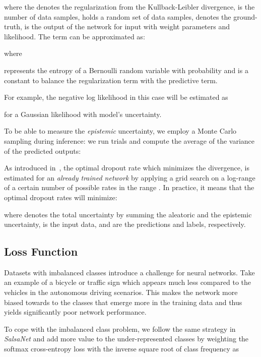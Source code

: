 \documentclass[letterpaper, 10 pt, conference]{ieeeconf}
\newcommand{\sn}[1]{\textit{SalsaNet }{#1}}
\begin{document}
where the  denotes the regularization from the Kullback-Leibler divergence,  is the number of data samples,  holds a random set of  data samples,  denotes the ground-truth,  is the output of the network for  input with weight parameters  and  likelihood. 
The  term can be approximated as:

 where 

represents the entropy of a Bernoulli random variable with probability  and  is a constant to balance the regularization term with the predictive term.

For example, the negative log likelihood in this case will be estimated as 

for a Gaussian likelihood with  model's uncertainty.








To be able to measure the \textit{epistemic} uncertainty, we employ a Monte Carlo sampling during inference: we run  trials and compute the average of the variance of the  predicted outputs:


As introduced in~\cite{segu2019general}, the optimal dropout rate  which minimizes the  divergence, is estimated for an \textit{already trained network} by applying a grid search on a log-range of a certain number of possible rates in the range . In practice, it means that the optimal dropout rates  will minimize:


where  denotes the total uncertainty by summing the aleatoric and the epistemic uncertainty,  is the input data,  and   are the predictions and  labels, respectively.


  

\subsection{Loss Function}
\label{sec:loss}

Datasets with imbalanced classes introduce a challenge for neural networks.
Take an example of  a bicycle  or  traffic sign which appears much less compared to the vehicles in the autonomous driving scenarios. This makes the network more biased towards to the classes that emerge more in the training data and thus yields significantly  poor network performance. 



To cope with the imbalanced class problem, we follow the same strategy in \sn and add more value to the under-represented classes by weighting the softmax cross-entropy loss  with the inverse square root of class frequency  as
\end{document}
